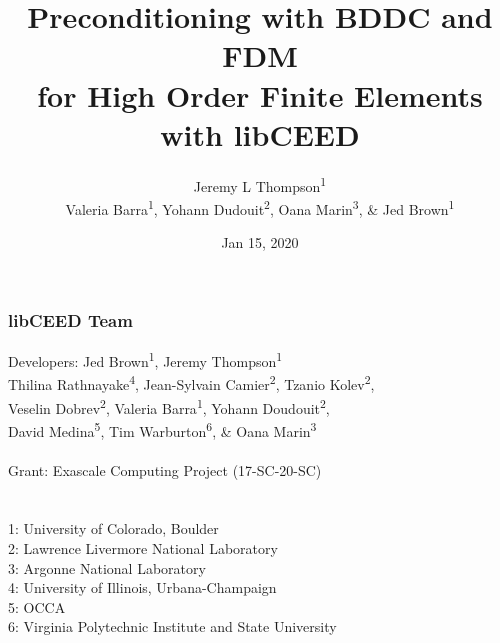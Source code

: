 \documentclass{beamer}
\title[libCEED Finite Element Library]{Preconditioning with BDDC and FDM\\for High Order Finite Elements with libCEED} %
\author[Jeremy L Thompson]{Jeremy L Thompson\textsuperscript{1}\\
 Valeria Barra\textsuperscript{1}, Yohann Dudouit\textsuperscript{2},
 Oana Marin\textsuperscript{3}, \& Jed Brown\textsuperscript{1}} %
\institute[CU Boulder] %
{1: University of Colorado Boulder \\
 2: Lawrence Livermore National Laboratory \\
 3: Argonne National Laboratory \\ %
\medskip
\textit{jeremy.thompson@colorado.edu} %
}
\date{Jan 15, 2020} %
\begin{document}
\begin{frame}
\titlepage %
\end{frame}


\begin{frame}
\begin{center}
\frametitle{libCEED Team}

{\flushleft

Developers: \hspace{2mm} Jed Brown\textsuperscript{1}, Jeremy Thompson\textsuperscript{1} \\
\hspace{23mm}  Thilina Rathnayake\textsuperscript{4}, Jean-Sylvain Camier\textsuperscript{2}, Tzanio Kolev\textsuperscript{2},\\
\hspace{23mm} Veselin Dobrev\textsuperscript{2}, Valeria Barra\textsuperscript{1}, Yohann Doudouit\textsuperscript{2},\\
\hspace{23mm} David Medina\textsuperscript{5}, Tim Warburton\textsuperscript{6}, \& Oana Marin\textsuperscript{3}\\

~\\

Grant: \hspace{11mm} Exascale Computing Project (17-SC-20-SC)\\

~\\

~\\

\small{1: University of Colorado, Boulder\\
2: Lawrence Livermore National Laboratory\\
3: Argonne National Laboratory\\
4: University of Illinois, Urbana-Champaign\\
5: OCCA\\
6: Virginia Polytechnic Institute and State University\\}}

\end{center}
\end{frame}

\end{document}
